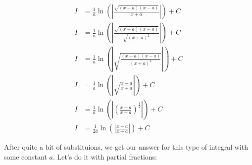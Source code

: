 \documentclass[12pt]{article}
\begin{document}
\begin{align}
    I                                                      & = \frac{1}{a} \ln\left(\left|\frac{\sqrt{(x+a)(x-a)}}{x+a}\right|\right) + C                                                                                  \\
    I                                                      & = \frac{1}{a} \ln\left(\left|\frac{\sqrt{(x+a)(x-a)}}{\sqrt{(x+a)^2}}\right|\right) + C                                                                       \\
    I                                                      & = \frac{1}{a} \ln\left(\left|\sqrt{\frac{(x+a)(x-a)}{(x+a)^2}}\right|\right) + C                                                                              \\
    I                                                      & = \frac{1}{a} \ln\left(\left|\sqrt{\frac{x-a}{x+a}}\right|\right) + C                                                                                         \\
    I                                                      & = \frac{1}{a} \ln\left(\left|\left(\frac{x-a}{x+a}\right)^{\frac{1}{2}}\right|\right) + C                                                                     \\
    I                                                      & = \frac{1}{2a} \ln\left(\left|\frac{x-a}{x+a}\right|\right) + C
\end{align}


After quite a bit of substituions, we get our answer for this type of integral with some constant $a$.
Let's do it with partial fractions:
\end{document}
